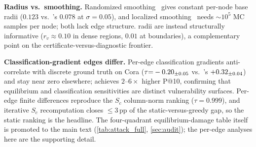 \textbf{Radius vs.\ smoothing.} Randomized smoothing~\cite{bojchevski2020efficient} gives constant
per-node base radii ($0.123$ vs.\ \AEGIS's $0.078$ at $\sigma{=}0.05$), and localized
smoothing~\cite{schuchardt2023localized} needs ${\sim}10^5$ MC samples per node; both lack edge
structure. \AEGIS radii are instead structurally informative ($r_v{\approx}0.10$ in dense regions,
$0.01$ at boundaries), a complementary point on the certificate-versus-diagnostic frontier.

\textbf{Classification-gradient edges differ.} Per-edge classification gradients anti-correlate with
discrete ground truth on Cora ($\tau{=}-0.20_{\pm 0.05}$ vs.\ \AEGIS's $+0.32_{\pm 0.04}$) and stay near
zero elsewhere; \AEGIS achieves $2$--$6\times$ higher P@10, confirming that equilibrium and
classification sensitivities are distinct vulnerability surfaces. Per-edge finite differences reproduce
the $S_c$ column-norm ranking ($\tau{=}0.999$), and iterative $S_c$ recomputation closes $\le3$\,pp of
the static-versus-greedy gap, so the static ranking is the headline. The four-quadrant
equilibrium-damage table itself is promoted to the main text (\cref{tab:attack_full},
\cref{sec:audit}); the per-edge analyses here are the supporting detail.

